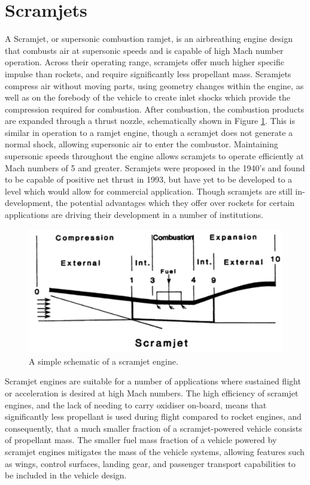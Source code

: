  
    
    \section{Scramjets}
    
    A Scramjet, or supersonic combustion ramjet, is an airbreathing engine design that combusts air at supersonic speeds and is capable of high Mach number operation. 
    Across their operating range, scramjets offer much higher specific impulse than rockets, and require significantly less propellant mass\cite{Billig1993,Cook2003}.
    Scramjets compress air without moving parts, using geometry changes within the engine\cite{Curran2001a}, as well as on the forebody of the vehicle to create inlet shocks which provide the compression required for combustion\cite{Smart2012}. After combustion, the combustion products are expanded through a thrust nozzle, schematically shown in Figure \ref{fig:scramjet}. This is similar in operation to a ramjet engine, though a scramjet does not generate a normal shock, allowing supersonic air to enter the combustor. Maintaining supersonic speeds throughout the engine allows scramjets to operate efficiently at Mach numbers of 5 and greater. 
    Scramjets were proposed in the 1940's\cite{Curran2001} and found to be capable of positive net thrust in 1993\cite{Paull1993}, but have yet to be developed to a level which would allow for commercial application. 
    Though scramjets are still in-development, the potential advantages which they offer over rockets for certain applications are driving their development in a number of institutions\cite{Curran2001b}.
    \begin{figure}[ht]
    	\centering
    	\includegraphics[width=0.7\linewidth]{figures/2_literature-review/scramjet}
    	\caption{A simple schematic of a scramjet engine\cite{Heiser1994}.}
    	\label{fig:scramjet}
    \end{figure}
    
    Scramjet engines are suitable for a number of applications where sustained flight or acceleration is desired at high Mach numbers. 
    The high efficiency of scramjet engines, and the lack of needing to carry oxidiser on-board, means that significantly less propellant is used during flight compared to rocket engines, and consequently, that a much smaller fraction of a scramjet-powered vehicle consists of propellant mass\cite{Curran2003}. 
    The smaller fuel mass fraction of a vehicle powered by scramjet engines mitigates the mass of the vehicle systems, allowing features such as wings, control surfaces, landing gear, and passenger transport capabilities to be included in the vehicle design\cite{Curran2003}. 
    
